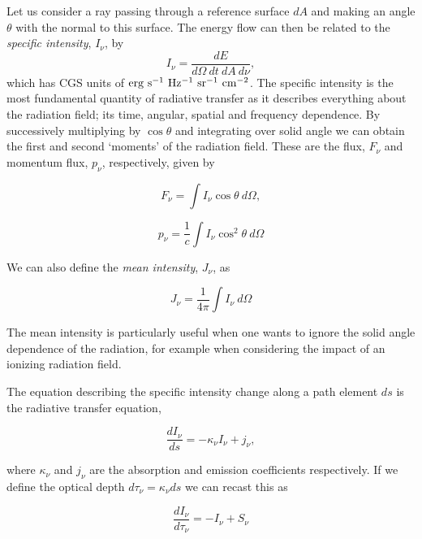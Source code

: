 Let us consider a ray passing through a reference surface $dA$ and 
making an angle $\theta$ with the normal to this surface. The energy
flow can then be related to the
{\em specific intensity}, $I_\nu$, by
\begin{equation}
I_\nu = \frac{dE}{d\Omega~dt~dA~d\nu},
\end{equation}
which has CGS units of ${\rm erg~s^{-1}~Hz^{-1}~sr^{-1}~cm^{-2}}$. The specific
intensity is the most fundamental quantity of radiative transfer as it describes 
everything about the radiation field; its time, angular, spatial and frequency
dependence.
By successively multiplying by $\cos \theta$ and integrating over solid angle we 
can obtain the first and second `moments' of the radiation field. These
are the flux, $F_\nu$ and momentum flux, $p_\nu$, respectively, given by

\begin{equation}
F_\nu = \int I_\nu \cos \theta~d \Omega,
\end{equation}

\begin{equation}
p_\nu = \frac{1}{c} \int I_\nu \cos^2 \theta~d \Omega
\end{equation}

We can also define the {\em mean intensity}, $J_\nu$, as

\begin{equation}
J_\nu = \frac{1}{4 \pi} \int I_\nu~d \Omega
\end{equation}

The mean intensity is particularly
useful when one wants to ignore the solid angle dependence of the radiation,
for example when considering the impact of an ionizing radiation field.

The equation describing the specific intensity change along a path element $ds$
is the radiative transfer equation, 

\begin{equation}
\frac{d I_\nu}{ds} = -\kappa_\nu I_\nu + j_\nu, 
\label{eq:rte}
\end{equation}

where $\kappa_\nu$ and $j_\nu$ are the absorption and emission coefficients respectively.
If we define the optical depth $d \tau_\nu = \kappa_\nu ds$ we can recast this as

\begin{equation}
\frac{d I_\nu}{d \tau_\nu} = -I_\nu + S_\nu
\label{eq:formal_rte}
\end{equation}

